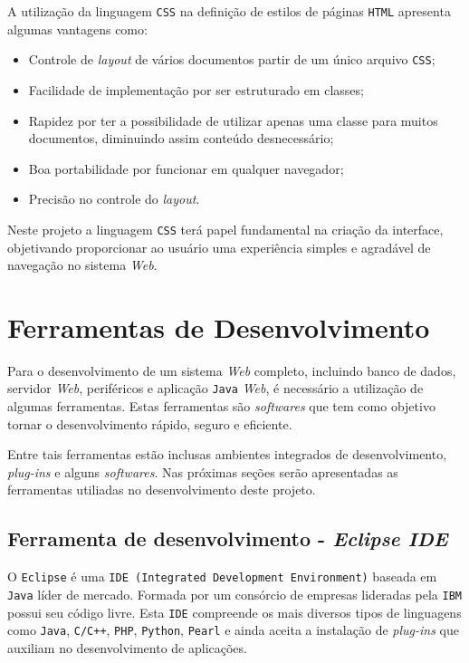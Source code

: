  A utilização da linguagem \texttt{CSS} na definição de estilos de páginas \texttt{HTML} apresenta algumas vantagens como:
 
 \begin{itemize}

	\item Controle de \textit{layout} de vários documentos partir de um único arquivo \texttt{CSS};
	\item Facilidade de implementação por ser estruturado em classes;
	\item Rapidez por ter a possibilidade de utilizar apenas uma classe para muitos documentos, diminuindo assim conteúdo desnecessário;
	\item Boa portabilidade por funcionar em qualquer navegador;
	\item Precisão no controle do \textit{layout}.

\end{itemize}

Neste projeto a linguagem \texttt{CSS} terá papel fundamental na criação da interface, objetivando proporcionar ao usuário uma experiência simples 
e agradável de navegação no sistema \textit{Web}.

\section{Ferramentas de Desenvolvimento}

Para o desenvolvimento de um sistema \textit{Web} completo, incluindo banco de dados, servidor \textit{Web}, periféricos e aplicação \texttt{Java} \textit{Web},
é necessário a utilização de algumas ferramentas. Estas ferramentas são \textit{softwares} que tem como 
objetivo tornar o desenvolvimento rápido, seguro e eficiente.

Entre tais ferramentas estão inclusas ambientes integrados de desenvolvimento, \textit{plug-ins} e alguns \textit{softwares}. Nas próximas seções serão
apresentadas as ferramentas utiliadas no desenvolvimento deste projeto.

\subsection{Ferramenta de desenvolvimento - \textit{Eclipse IDE}}

O \texttt{Eclipse} é uma \texttt{IDE (Integrated Development Environment)} baseada em \texttt{Java} líder de mercado. Formada por um consórcio de empresas
lideradas pela \texttt{IBM} possui seu código livre. Esta \texttt{IDE} compreende os mais diversos tipos de linguagens como \texttt{Java}, \texttt{C/C++}, \texttt{PHP}, \texttt{Python}, 
\texttt{Pearl} e ainda aceita a instalação de \textit{plug-ins} que auxiliam no desenvolvimento de aplicações.

